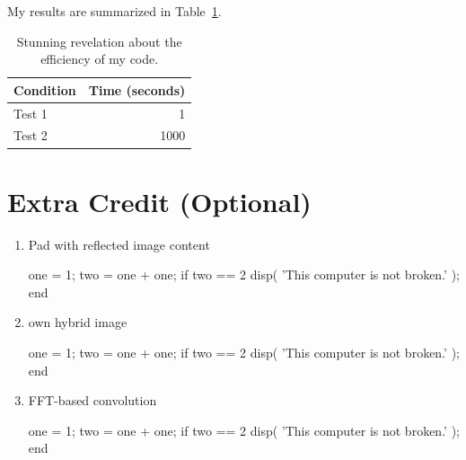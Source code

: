 My results are summarized in Table~\ref{tab:table1}.

\begin{table}[h]
    \centering
    \begin{tabular}{lr}
        \toprule
        Condition & Time (seconds) \\
        \midrule
        Test 1 & 1 \\
        Test 2 & 1000 \\
        \bottomrule
    \end{tabular}
    \caption{Stunning revelation about the efficiency of my code.}
    \label{tab:table1}
\end{table}

\section*{Extra Credit (Optional)}
\begin{enumerate}
   
    \item Pad with reflected image content
        \begin{python}
        one = 1;
        two = one + one;
        if two == 2
            disp( 'This computer is not broken.' );
        end
        \end{python}
    
    \item own hybrid image
        \begin{python}
        one = 1;
        two = one + one;
        if two == 2
            disp( 'This computer is not broken.' );
        end
        \end{python} 

    \item FFT-based convolution
        \begin{python}
        one = 1;
        two = one + one;
        if two == 2
            disp( 'This computer is not broken.' );
        end
        \end{python} 
\end{enumerate}


